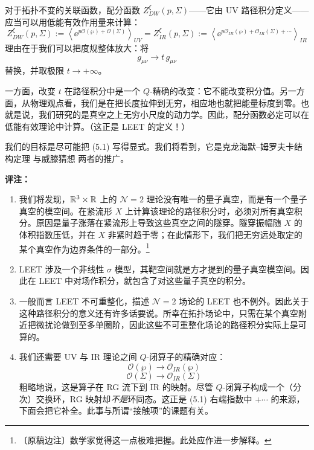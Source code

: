 对于拓扑不变的关联函数，配分函数 $Z^{\xi}_{DW}(p,\Sigma)$——它由 UV 路径积分定义——应当可以用低能有效作用量来计算：
\begin{equation}
Z^{\xi}_{DW}(p,\Sigma):=\left\langle \ee^{p\mathcal{O}(\wp)+\mathcal{O}(\Sigma)}\right\rangle_{UV}
=Z^{\xi}_{IR}(p,\Sigma):=\left\langle \ee^{p\mathcal{O}_{IR}(\wp)+\mathcal{O}_{IR}(\Sigma)+\cdots}\right\rangle_{IR}
\tag{5.1}
\end{equation}
理由在于我们可以把度规整体放大：将
\begin{equation}
g_{\mu\nu}\to t\,g_{\mu\nu}
\tag{5.2}
\end{equation}
替换，并取极限 $t\to+\infty$。

一方面，改变 $t$ 在路径积分中是一个 $Q$-精确的改变：它不能改变积分值。另一方面，从物理观点看，我们是在把长度拉伸到无穷，相应地也就把能量标度到零。也就是说，我们研究的是真空之上无穷小尺度的动力学。因此，配分函数必定可以在低能有效理论中计算。（这正是 LEET 的定义！）

我们的目标是尽可能把 (5.1) 写得显式。我们将看到，它是克龙海默--姆罗夫卡结构定理 \cite{ref21} 与威滕猜想 \cite{ref55} 两者的推广。

\medskip
\noindent\textbf{评注：}
\begin{enumerate}[label=\arabic*., leftmargin=2.1em]
\item 我们将发现，$\mathbb{R}^{3}\times\mathbb{R}$ 上的 $\mathcal{N}=2$ 理论没有唯一的量子真空，而是有一个量子真空的模空间。在紧流形 $X$ 上计算该理论的路径积分时，必须对所有真空积分。原因是量子涨落在紧流形上导致这些真空之间的隧穿。隧穿振幅随 $X$ 的体积指数压低，并在 $X$ 非紧时趋于零；在此情形下，我们把无穷远处取定的某个真空作为边界条件的一部分。\footnote{〔原稿边注〕数学家觉得这一点极难把握。此处应作进一步解释。}
\item LEET 涉及一个非线性 $\sigma$ 模型，其靶空间就是方才提到的量子真空模空间。因此在 LEET 中对场作积分，就包含了对这些量子真空的积分。
\item 一般而言 LEET 不可重整化，描述 $\mathcal{N}=2$ 场论的 LEET 也不例外。因此关于这种路径积分的意义还有许多话要说。所幸在拓扑场论中，只需在某个真空附近把微扰论做到至多单圈阶，因此这些不可重整化场论的路径积分实际上是可算的。
\item 我们还需要 UV 与 IR 理论之间 $Q$-闭算子的精确对应：
\begin{equation}
\mathcal{O}(\wp)\to\mathcal{O}_{IR}(\wp)
\tag{5.3}
\end{equation}
\begin{equation}
\mathcal{O}(\Sigma)\to\mathcal{O}_{IR}(\Sigma)
\tag{5.4}
\end{equation}
粗略地说，这是算子在 RG 流下到 IR 的映射。尽管 $Q$-闭算子构成一个（分次）交换环，RG 映射却\emph{不是}环同态。这正是 (5.1) 右端指数中 $+\cdots$ 的来源，下面会把它补全。此事与所谓“接触项”的课题有关。
\end{enumerate}

